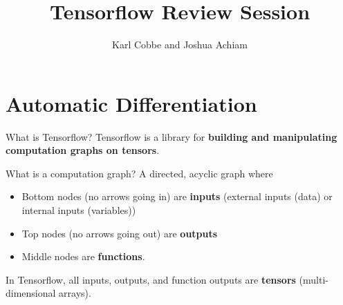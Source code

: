 \documentclass[]{beamer}
\begin{document}
\title{Tensorflow Review Session}
\author{Karl Cobbe and Joshua Achiam}

\begin{frame}
\titlepage
\end{frame}

\section{Automatic Differentiation}
\begin{frame}{What is Tensorflow?}
Tensorflow is a library for \textbf{building and manipulating computation graphs on tensors}.

\vfill

What is a computation graph? A directed, acyclic graph where
\begin{itemize}
\item Bottom nodes (no arrows going in) are \textbf{inputs} (external inputs (data) or internal inputs (variables))
\item Top nodes (no arrows going out) are \textbf{outputs}
\item Middle nodes are \textbf{functions}. 
\end{itemize}

In Tensorflow, all inputs, outputs, and function outputs are \textbf{tensors} (multi-dimensional arrays).
\end{frame}
\end{document}
